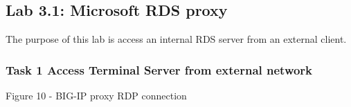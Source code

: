 \documentclass[letterpaper,10pt,english]{sphinxmanual}
\begin{document}
\subsection{Lab 3.1: Microsoft RDS proxy}
\label{\detokenize{class2/module3/lab1:lab-3-1-microsoft-rds-proxy}}\label{\detokenize{class2/module3/lab1::doc}}
The purpose of this lab is access an internal RDS server from an
external client.


\subsubsection{Task 1 \textendash{} Access Terminal Server from external network}
\label{\detokenize{class2/module3/lab1:task-1-access-terminal-server-from-external-network}}

Figure 10 - BIG-IP proxy RDP connection
\end{document}
